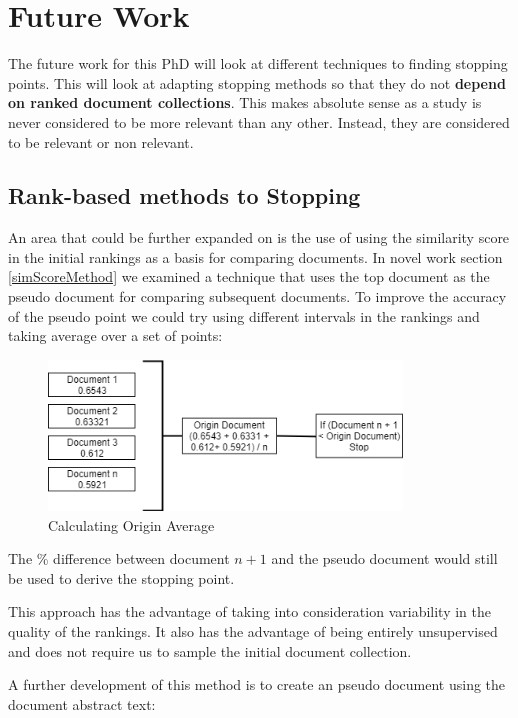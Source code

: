 \chapter{Future Work} \label{fw}


The future work for this PhD will look at different techniques to finding stopping points. This will look at adapting stopping methods so that they do not \textbf{depend on ranked document collections}. This makes absolute sense as a study is never considered to be more relevant than any other. Instead, they are considered to be relevant or non relevant. 


\section{Rank-based methods to Stopping}

An area that could be further expanded on is the use of using the similarity score in the initial rankings as a basis for comparing documents. In novel work section \ref{simScoreMethod} we examined a technique that uses the top document as the pseudo document for comparing subsequent documents. To improve the accuracy of the pseudo point we could try using different intervals in the rankings and taking average over a set of points:


\begin{figure}[H]
\center
\includegraphics[height=4cm]{figures/originMethod.png}
\caption{Calculating Origin Average}
\end{figure}

The \% difference between document $n+1$ and the pseudo document would still be used to derive the stopping point.

This approach has the advantage of taking into consideration variability in the quality of the rankings. It also has the advantage of being entirely unsupervised and does not require us to sample the initial document collection. 

A further development of this method is to create an pseudo document using the document abstract text:

